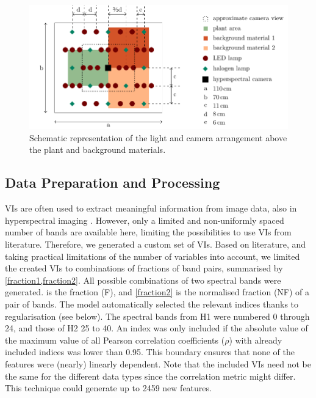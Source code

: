 \documentclass[10pt,authoryear,a4paper,review]{elsarticle}
\begin{document}
    \begin{figure}[tb]
        \centering
        \includegraphics[width=\linewidth]{figures/lamp-layout}
        \caption{Schematic representation of the light and camera arrangement above the plant and background materials.}
        \label{fig:lamp-layout}
    \end{figure}
    
    \subsection{Data Preparation and Processing}
    
        VIs are often used to extract meaningful information from image data, also in hyperspectral imaging \citep{vogelmannRed1993}. However, only a limited and non-uniformly spaced number of bands are available here, limiting the possibilities to use VIs from literature. Therefore, we generated a custom set of VIs. Based on literature, and taking practical limitations of the number of variables into account, we limited the created VIs to combinations of fractions of band pairs, summarised by \cref{fraction1,fraction2}. All possible combinations of two spectral bands were generated.  is the fraction (F), and \cref{fraction2} is the normalised fraction (NF) of a pair of bands. The model automatically selected the relevant indices thanks to regularisation (see below). The spectral bands from H1 were numbered 0 through 24, and those of H2 25 to 40. An index was only included if the absolute value of the maximum value of all Pearson correlation coefficients ($\rho$) with already included indices was lower than 0.95. This boundary ensures that none of the features were (nearly) linearly dependent. Note that the included VIs need not be the same for the different data types since the correlation metric might differ. This technique could generate up to 2459 new features.
        
\end{document}
